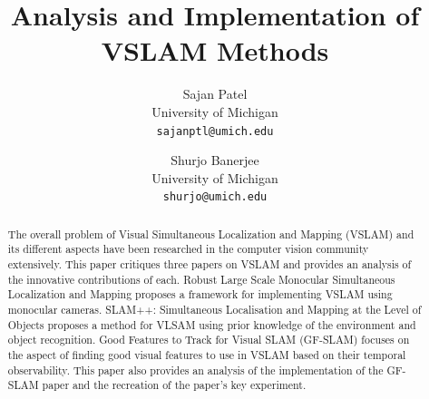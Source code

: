 \documentclass[10pt,twocolumn,letterpaper]{article}
\begin{document}
\title{Analysis and Implementation of VSLAM Methods}

\author{Sajan Patel\\
University of Michigan\\
{\tt\small sajanptl@umich.edu}
\and
Shurjo Banerjee\\
University of Michigan\\
{\tt\small shurjo@umich.edu}
}

\maketitle

\begin{abstract}
The overall problem of Visual Simultaneous Localization and Mapping (VSLAM) and its different aspects have 
been researched in the computer vision community extensively. This paper critiques three papers on VSLAM 
and provides an analysis of the innovative contributions of each. Robust Large Scale Monocular Simultaneous Localization and Mapping proposes a framework for implementing VSLAM using monocular cameras. SLAM++: Simultaneous Localisation and Mapping at the Level of Objects proposes a method for VLSAM using prior knowledge of the environment and object recognition. Good Features to Track for Visual SLAM (GF-SLAM) focuses on the aspect of finding good visual features to use in VSLAM based on their temporal observability. This paper also provides an analysis of the implementation of the GF-SLAM paper and the recreation of the paper's key experiment.
\end{abstract}

\end{document}
